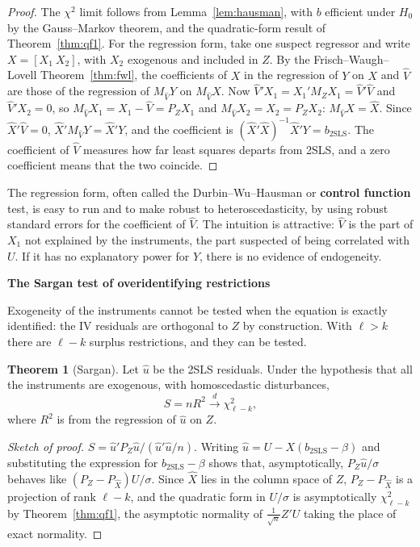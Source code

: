 \documentclass[11pt,a4paper]{article}
\numberwithin{equation}{section}
\theoremstyle{definition}
\newtheorem{thm}{Theorem}[subsection]
\newcommand{\subhead}[1]{%
  \par\medskip\noindent\textbf{#1}\par\nobreak\smallskip}
\begin{document}
\begin{proof}
The $\chi^2$ limit follows from Lemma~\ref{lem:hausman}, with $b$ efficient under $H_0$ by the Gauss--Markov theorem, and the quadratic-form result of
Theorem~\ref{thm:qf1}. For the regression form, take one suspect regressor and write $X = [X_1\ X_2]$, with $X_2$ exogenous and included in $Z$. By the
Frisch--Waugh--Lovell Theorem~\ref{thm:fwl}, the coefficients of $X$ in the regression of $Y$ on $X$ and $\hat V$ are those of the regression of $M_{\hat V}Y$ on $M_{\hat V}X$.
Now $\hat V'X_1 = X_1'M_ZX_1 = \hat V'\hat V$ and $\hat V'X_2 = 0$, so $M_{\hat V}X_1 = X_1 - \hat V = P_ZX_1$ and $M_{\hat V}X_2 = X_2 = P_ZX_2$: $M_{\hat V}X = \hat X$. Since $\hat X'\hat V = 0$,
$\hat X'M_{\hat V}Y = \hat X'Y$, and the coefficient is $(\hat X'\hat X)^{-1}\hat X'Y = b_{\text{2SLS}}$. The coefficient of $\hat V$ measures how far least squares departs from 2SLS, and a
zero coefficient means that the two coincide.
\end{proof}

The regression form, often called the Durbin--Wu--Hausman or \textbf{control function} test, is easy to run and to make robust to
heteroscedasticity, by using robust standard errors for the coefficient of $\hat V$. The intuition is attractive: $\hat V$ is the part of $X_1$ not explained by
the instruments, the part suspected of being correlated with $U$. If it has no explanatory power for $Y$, there is no evidence of endogeneity.

\subhead{The Sargan test of overidentifying restrictions}
Exogeneity of the instruments cannot be tested when the equation is exactly identified: the IV residuals are orthogonal to $Z$ by construction.
With $\ell > k$ there are $\ell - k$ surplus restrictions, and they can be tested.

\begin{thm}[Sargan]
\label{thm:sargan}
Let $\hat u$ be the 2SLS residuals. Under the hypothesis that all the instruments are exogenous, with homoscedastic disturbances,
\[
S = nR^2 \xrightarrow{d} \chi^2_{\ell - k},
\]
where $R^2$ is from the regression of $\hat u$ on $Z$.
\end{thm}

\begin{proof}[Sketch of proof]
$S = \hat u'P_Z\hat u/(\hat u'\hat u/n)$. Writing $\hat u = U - X(b_{\text{2SLS}} - \beta)$ and substituting the expression for $b_{\text{2SLS}} - \beta$ shows that, asymptotically,
$P_Z\hat u/\sigma$ behaves like $(P_Z - P_{\hat X})U/\sigma$. Since $\hat X$ lies in the column space of $Z$, $P_Z - P_{\hat X}$ is a projection of rank $\ell - k$, and the quadratic
form in $U/\sigma$ is asymptotically $\chi^2_{\ell - k}$ by Theorem~\ref{thm:qf1}, the asymptotic normality of $\frac{1}{\sqrt n}Z'U$ taking the place of exact normality.
\end{proof}
\end{document}

